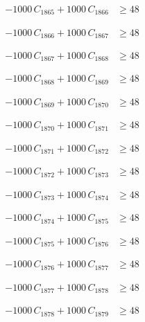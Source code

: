 \documentclass[a4paper,11pt]{article}
\begin{document}
\begin{align}
-1000\,C_{1865} + 1000\,C_{1866} &\geq 48 \nonumber
\end{align}

\begin{align}
-1000\,C_{1866} + 1000\,C_{1867} &\geq 48 \nonumber
\end{align}

\begin{align}
-1000\,C_{1867} + 1000\,C_{1868} &\geq 48 \nonumber
\end{align}

\begin{align}
-1000\,C_{1868} + 1000\,C_{1869} &\geq 48 \nonumber
\end{align}

\begin{align}
-1000\,C_{1869} + 1000\,C_{1870} &\geq 48 \nonumber
\end{align}

\begin{align}
-1000\,C_{1870} + 1000\,C_{1871} &\geq 48 \nonumber
\end{align}

\begin{align}
-1000\,C_{1871} + 1000\,C_{1872} &\geq 48 \nonumber
\end{align}

\begin{align}
-1000\,C_{1872} + 1000\,C_{1873} &\geq 48 \nonumber
\end{align}

\begin{align}
-1000\,C_{1873} + 1000\,C_{1874} &\geq 48 \nonumber
\end{align}

\begin{align}
-1000\,C_{1874} + 1000\,C_{1875} &\geq 48 \nonumber
\end{align}

\begin{align}
-1000\,C_{1875} + 1000\,C_{1876} &\geq 48 \nonumber
\end{align}

\begin{align}
-1000\,C_{1876} + 1000\,C_{1877} &\geq 48 \nonumber
\end{align}

\begin{align}
-1000\,C_{1877} + 1000\,C_{1878} &\geq 48 \nonumber
\end{align}

\begin{align}
-1000\,C_{1878} + 1000\,C_{1879} &\geq 48 \nonumber
\end{align}
\end{document}
